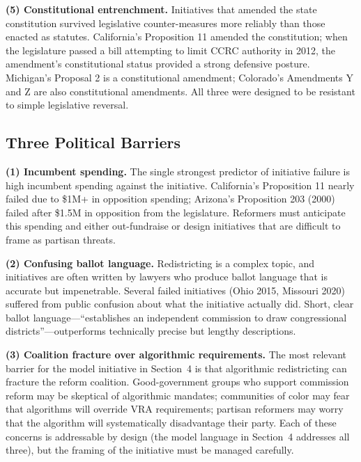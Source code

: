 \textbf{(5) Constitutional entrenchment.} Initiatives that amended the state constitution survived legislative counter-measures more reliably than those enacted as statutes. California's Proposition 11 amended the constitution; when the legislature passed a bill attempting to limit CCRC authority in 2012, the amendment's constitutional status provided a strong defensive posture. Michigan's Proposal 2 is a constitutional amendment; Colorado's Amendments Y and Z are also constitutional amendments. All three were designed to be resistant to simple legislative reversal.

\subsection{Three Political Barriers}

\textbf{(1) Incumbent spending.} The single strongest predictor of initiative failure is high incumbent spending against the initiative. California's Proposition 11 nearly failed due to \$1M+ in opposition spending; Arizona's Proposition 203 (2000) failed after \$1.5M in opposition from the legislature. Reformers must anticipate this spending and either out-fundraise or design initiatives that are difficult to frame as partisan threats.

\textbf{(2) Confusing ballot language.} Redistricting is a complex topic, and initiatives are often written by lawyers who produce ballot language that is accurate but impenetrable. Several failed initiatives (Ohio 2015, Missouri 2020) suffered from public confusion about what the initiative actually did. Short, clear ballot language---``establishes an independent commission to draw congressional districts''---outperforms technically precise but lengthy descriptions.

\textbf{(3) Coalition fracture over algorithmic requirements.} The most relevant barrier for the model initiative in Section~4 is that algorithmic redistricting can fracture the reform coalition. Good-government groups who support commission reform may be skeptical of algorithmic mandates; communities of color may fear that algorithms will override VRA requirements; partisan reformers may worry that the algorithm will systematically disadvantage their party. Each of these concerns is addressable by design (the model language in Section~4 addresses all three), but the framing of the initiative must be managed carefully.
